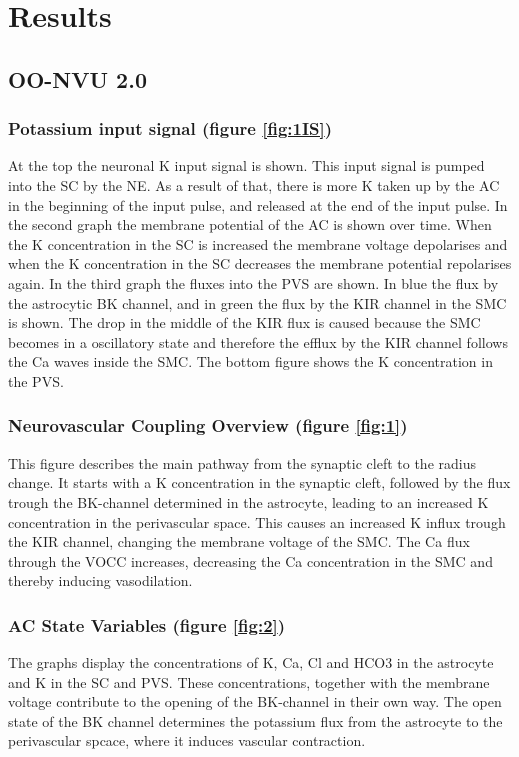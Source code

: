 %
	\section{Results}
	\subsection {OO-NVU 2.0}
	\subsubsection*{Potassium input signal (figure \ref{fig:1IS})}
	At the top the neuronal \gls{K} input signal is shown. This input signal is pumped into the SC by the \gls{NE}. As a result of that, there is more \gls{K} taken up by the \gls{AC} in the beginning of the input pulse, and released at the end of the input pulse. In the second graph the membrane potential of the AC is shown over time. When the \gls{K} concentration in the SC is increased the membrane voltage depolarises and when the \gls{K} concentration in the SC decreases the membrane potential repolarises again.
	In the third graph the fluxes into the PVS are shown. In blue the flux by the astrocytic BK channel, and in green the flux by the KIR channel in the SMC is shown. The drop in the middle of the KIR flux is caused because the SMC becomes in a oscillatory state and therefore the efflux by the KIR channel follows the \gls{Ca} waves inside the SMC.
	The bottom figure shows the \gls{K} concentration in the PVS.
	
	\subsubsection*{Neurovascular Coupling Overview (figure \ref{fig:1})}
	This figure describes the main pathway from the synaptic cleft to the radius change. It starts with a \gls{K} concentration in the synaptic cleft, followed by the flux trough the BK-channel determined in the astrocyte, leading to an increased \gls{K} concentration in the perivascular space. This causes an increased  \gls{K} influx trough the KIR channel, changing the membrane voltage of the SMC. The \gls{Ca} flux through the VOCC increases, decreasing the \gls{Ca} concentration in the SMC and thereby inducing vasodilation. 
			
	
	\subsubsection*{AC State Variables (figure \ref{fig:2})}
	The graphs display the concentrations of \gls{K}, \gls{Ca}, Cl and HCO3 in the astrocyte and \gls{K} in the SC and PVS. These concentrations, together with the membrane voltage contribute to the opening of the BK-channel in their own way. The open state of the BK channel determines the potassium flux from the astrocyte to the perivascular spcace, where it induces vascular contraction.
	
